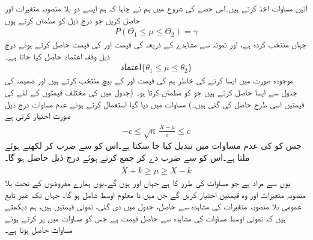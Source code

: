 آئیں مساوات  اخذ کرتے ہیں۔اس حصے کی شروع میں ہم نے چاہا کہ ہم ایسے دو بلا منصوبہ متغیرات  اور  حاصل کریں جو درج ذیل کو مطمئن کرتے ہوں
\begin{align}\label{مساوات-شماریات_غیر_تابع_متغیرات_اوسط_تغیریت_پ}
P(\Theta_1\le \mu\le \Theta_2)=\gamma
\end{align}
جہاں  منتخب کردہ ہے، اور نمونہ سے مشاہدے کے ذریعہ  کی قیمت  اور  کی قیمت  حاصل کرتے ہوئے درج ذیل  وقفہ اعتماد  حاصل کیا جاتا ہے۔
\begin{align*}
\text{اعتماد}\{\theta_1\le \mu\le\theta_2\}
\end{align*}
موجودہ صورت میں ایسا کرنے کی خاطر ہم  کی قیمت  اور  کے بیچ منتخب کرتے ہیں اور  ضمیمہ  کی جدول  سے ایسا  حاصل کرتے ہیں جو  کو مطمئن کرتا ہو۔ (جدول  میں  کی مختلف قیمتوں کے لئے  کی قیمتیں اسی طرح حاصل کی گئی ہیں۔) مساوات  میں دیا گیا  استعمال کرتے ہوئے عدم مساوات  درج ذیل صورت اختیار کرتی ہے
\begin{align*}
-c\le \sqrt{n}\,\frac{\overline{X}-\mu}{\sigma}\le c
\end{align*}
جس کو  کی عدم مساوات میں تبدیل کیا جا سکتا ہے۔اس کو  سے ضرب کر   لکھتے ہوئے   ملتا ہے۔اس کو  سے ضرب دے کر  جمع کرتے ہوئے درج ذیل حاصل ہو گا۔
\begin{align}\label{مساوات-شماریات_غیر_تابع_متغیرات_اوسط_تغیریت_ت}
\overline{X}+k\ge \mu\ge \overline{X}-k
\end{align}
یوں  سے مراد  ہے جو 
 مساوات  کی طرز کا ہے جہاں  اور  ہوں گے۔یوں ہمارے مفروضوں کے تحت بلا منصوبہ متغیرات  اور  وہ قیمتیں اختیار کریں گے جن میں نا معلوم اوسط  شامل ہو گا۔ جہاں تک  غیر تابع عمومی بلا منصوبہ متغیرات  کی مشاہدہ سے حاصل، جدول  میں دی گئی،  نمونی قیمتیں   ہیں، ہم دیکھتے ہیں کہ نمونی اوسط  مساوات  کی مشاہدہ سے حاصل قیمت ہے جس کو مساوات  میں پر کرتے ہوئے مساوات  حاصل ہوتا ہے۔



